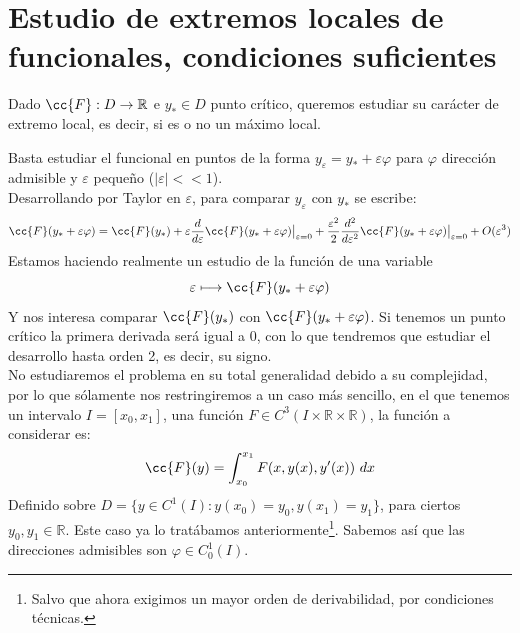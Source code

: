 \section{Estudio de extremos locales de funcionales, condiciones suficientes}
\noindent
Dado $\cc{F}:D\to \mathbb{R}$ e $y_\ast \in D$ punto crítico, queremos estudiar su carácter de extremo local, es decir, si es o no un máximo local.

Basta estudiar el funcional en puntos de la forma $y_\varepsilon = y_\ast+\varepsilon\varphi$ para $\varphi$ dirección admisible y $\varepsilon$ pequeño ($|\varepsilon| << 1$).\\

\noindent
Desarrollando por Taylor en $\varepsilon$, para comparar $y_\varepsilon$ con $y_\ast$ se escribe:
\begin{equation*}
    \cc{F}(y_\ast + \varepsilon\varphi) = \cc{F}(y_\ast) +\varepsilon \frac{d}{d\varepsilon} \cc{F}(y_\ast + \varepsilon\varphi) \big|_{\varepsilon = 0} + \frac{\varepsilon^2}{2} \frac{d^2}{d\varepsilon^2} \cc{F}(y_\ast+\varepsilon\varphi)\big|_{\varepsilon=0} + O(\varepsilon^3)
\end{equation*}
Estamos haciendo realmente un estudio de la función de una variable
\begin{equation*}
    \varepsilon\longmapsto \cc{F}(y_\ast + \varepsilon\varphi)
\end{equation*}
Y nos interesa comparar $\cc{F}(y_\ast)$ con $\cc{F}(y_\ast + \varepsilon\varphi)$. Si tenemos un punto crítico la primera derivada será igual a 0, con lo que tendremos que estudiar el desarrollo hasta orden 2, es decir, su signo.\\

\noindent
No estudiaremos el problema en su total generalidad debido a su complejidad, por lo que sólamente nos restringiremos a un caso más sencillo, en el que tenemos un intervalo $I = [x_0,x_1]$, una función $F\in C^3(I\times \mathbb{R}\times \mathbb{R})$, la función a considerar es:
\begin{equation*}
    \cc{F}(y) = \int_{x_0}^{x_1} F(x,y(x),y'(x))~dx 
\end{equation*}
Definido sobre $D = \{y\in C^1(I) : y(x_0) = y_0, y(x_1) = y_1\}$, para ciertos $y_0,y_1\in \mathbb{R}$. Este caso ya lo tratábamos anteriormente\footnote{Salvo que ahora exigimos un mayor orden de derivabilidad, por condiciones técnicas.}. Sabemos así que las direcciones admisibles son $\varphi \in C_0^1(I)$.\\

